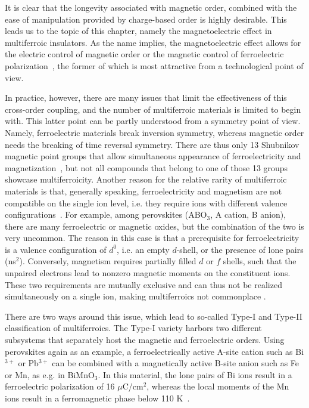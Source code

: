 It is clear that the longevity associated with magnetic order, combined with the ease of manipulation provided by charge-based order is highly desirable.
This leads us to the topic of this chapter, namely the magnetoelectric effect in multiferroic insulators.
As the name implies, the magnetoelectric effect allows for the electric control of magnetic order or the magnetic control of ferroelectric polarization~\cite{Spaldin2019,Khomskii2009,Fiebig2005,Fiebig2016,Cheong2007}, the former of which is most attractive from a technological point of view.

In practice, however, there are many issues that limit the effectiveness of this cross-order coupling, and the number of multiferroic materials is limited to begin with.
This latter point can be partly understood from a symmetry point of view.
Namely, ferroelectric materials break inversion symmetry, whereas magnetic order needs the breaking of time reversal symmetry.
There are thus only 13 Shubnikov magnetic point groups that allow simultaneous appearance of ferroelectricity and magnetization~\cite{Wang2009}, but not all compounds that belong to one of those 13 groups showcase multiferroicity.
Another reason for the relative rarity of multiferroic materials is that, generally speaking, ferroelectricity and magnetism are not compatible on the single ion level, i.e. they require ions with different valence configurations~\cite{Spaldin2019}.
For example, among perovskites (ABO$_3$, A cation, B anion), there are many ferroelectric or magnetic oxides, but the combination of the two is very uncommon.
The reason in this case is that a prerequisite for ferroelectricity is a valence configuration of $d^0$, i.e. an empty $d$-shell, or the presence of lone pairs (ns$^2$).
Conversely, magnetism requires partially filled $d$ or $f$ shells, such that the unpaired electrons lead to nonzero magnetic moments on the constituent ions.
These two requirements are mutually exclusive and can thus not be realized simultaneously on a single ion, making multiferroics not commonplace .

There are two ways around this issue, which lead to so-called Type-I and Type-II classification of multiferroics\cite{Khomskii2009}.
The Type-I variety harbors two different subsystems that separately host the magnetic and ferroelectric orders.
Using perovskites again as an example, a ferroelectrically active A-site cation such as Bi$^{3+}$ or Pb$^{3+}$ can be combined with a magnetically active B-site anion such as Fe or Mn, as e.g. in BiMnO$_3$. In this material, the lone pairs of Bi ions result in a ferroelectric polarization of 16 $\mu$C/cm$^2$, whereas the local moments of the Mn ions result in a ferromagnetic phase below 110 K~\cite{Wang2009}.

